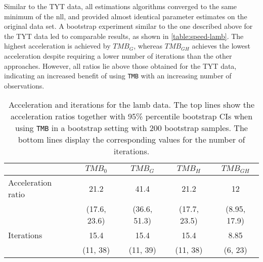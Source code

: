\documentclass[bimj,fleqn]{w-art}\usepackage[]{graphicx}\usepackage[]{color}
\theoremstyle{plain}
\theoremstyle{definition}
\begin{document}
% 
% 

Similar to the TYT data, all estimations algorithms converged to the same minimum of the nll, and provided almost identical parameter estimates on the original data set. A bootstrap experiment similar to the one described above for the TYT data led to comparable results, as shown in \autoref{table:speed-lamb}. The highest acceleration is achieved by $TMB_G$, whereas $TMB_{GH}$ achieves the lowest acceleration despite requiring a lower number of iterations than the other approaches. However, all ratios lie above those obtained for the TYT data, indicating an increased benefit of using {\tt TMB} with an increasing number of observations.

\begin{table}[ht]
\centering
\begin{tabular}{lcccc}
  \hline
 & \textit{${TMB_0}$} & \textit{${TMB_G}$} & \textit{${TMB_H}$} & \textit{${TMB_{GH}}$} \\ 
  \hline
Acceleration ratio & 21.2 & 41.4 & 21.2 & 12 \\ 
   &  (17.6, 23.6)  &  (36.6, 51.3)  &  (17.7, 23.5)  &  (8.95, 17.9)  \\ 
  Iterations & 15.4 & 15.4 & 15.4 & 8.85 \\ 
   &  (11, 38)  &  (11, 39)  &  (11, 38)  &  (6, 23)  \\ 
   \hline
\end{tabular}
\caption{Acceleration and iterations for the lamb data. The top lines show the acceleration ratios together with 95\% percentile bootstrap CIs when using {\tt TMB} in a bootstrap setting with 200 bootstrap samples. The bottom lines display the corresponding values for the number of iterations.} 
\label{table:speed-lamb}
\end{table}
\end{document}
